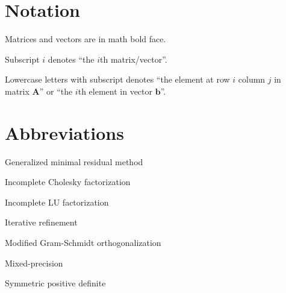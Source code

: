 \newcommand{\matr}[1]{\mathbf{#1}}
\renewcommand{\vec}[1]{\mathbf{#1}}
\newcommand{\spann}[1]{\mathrm{span}\{#1\}}
\newcommand{\transpose}{^\intercal}
\newcommand{\norm}[1]{\left\lVert#1\right\rVert}
\newcommand{\cond}[1]{\mathrm{cond}(#1)}
\newcommand{\bigO}{\mathcal{O}}


\section*{Notation}
\begin{description}[font=\rmfamily\bfseries, leftmargin=3cm, style=nextline]
\item[\(\matr{A}, \vec{b}\)] Matrices and vectors are in math bold face.
\item[\(\matr{A}_i, \vec{b}_i\)] Subscript \(i\) denotes ``the \(i\)th matrix/vector''.
\item[\(a_{i,j}, b_{i}\)] Lowercase letters with subscript denotes ``the element at
  row \(i\) column \(j\) in matrix \(\matr{A}\)'' or ``the \(i\)th element in
  vector \(\vec{b}\)''.
\end{description}


\section*{Abbreviations}
\begin{description}[font=\rmfamily\bfseries, leftmargin=3cm, style=nextline]
\item[GMRES] Generalized minimal residual method
\item[IC] Incomplete Cholesky factorization
\item[ILU] Incomplete LU factorization
\item[IR] Iterative refinement
\item[MGS] Modified Gram-Schmidt orthogonalization
\item[MP] Mixed-precision
\item[SPD] Symmetric positive definite
\end{description}
